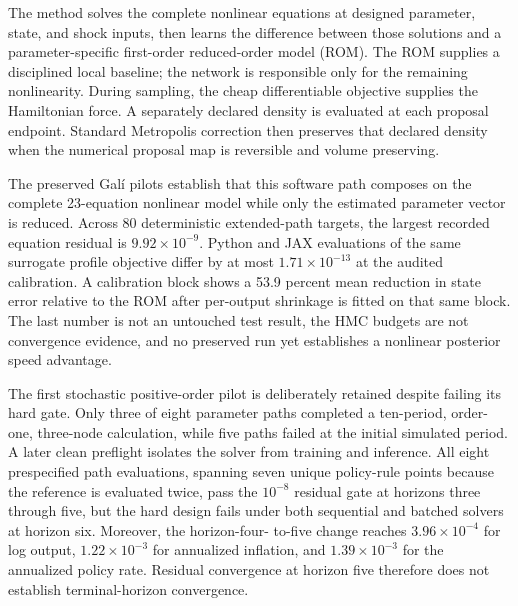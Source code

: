 \documentclass[11pt]{article}
\begin{document}
The method solves the complete nonlinear equations at designed parameter,
state, and shock inputs, then learns the difference between those solutions and
a parameter-specific first-order reduced-order model (ROM). The ROM supplies a
disciplined local baseline; the network is responsible only for the remaining
nonlinearity. During sampling, the cheap differentiable objective supplies the
Hamiltonian force. A separately declared density is evaluated at each proposal
endpoint. Standard Metropolis correction then preserves that declared density
when the numerical proposal map is reversible and volume preserving.

The preserved Gal\'i pilots establish that this software path composes on the
complete 23-equation nonlinear model while only the estimated parameter vector
is reduced. Across 80 deterministic extended-path targets, the largest recorded
equation residual is $9.92\times10^{-9}$. Python and JAX evaluations of the same
surrogate profile objective differ by at most $1.71\times10^{-13}$ at the
audited calibration. A calibration block shows a 53.9 percent mean reduction in
state error relative to the ROM after per-output shrinkage is fitted on that
same block. The last number is not an untouched test result, the HMC budgets are
not convergence evidence, and no preserved run yet establishes a nonlinear
posterior speed advantage.

The first stochastic positive-order pilot is deliberately retained despite
failing its hard gate. Only three of eight parameter paths completed a
ten-period, order-one, three-node calculation, while five paths failed at the
initial simulated period. A later clean preflight isolates the solver from
training and inference. All eight prespecified path evaluations, spanning seven
unique policy-rule points because the reference is evaluated twice, pass the
$10^{-8}$ residual gate at horizons three through five, but the hard design fails under
both sequential and batched solvers at horizon six. Moreover, the horizon-four-
to-five change reaches $3.96\times10^{-4}$ for log output,
$1.22\times10^{-3}$ for annualized inflation, and $1.39\times10^{-3}$ for the
annualized policy rate. Residual convergence at horizon five therefore does not
establish terminal-horizon convergence.
\end{document}

